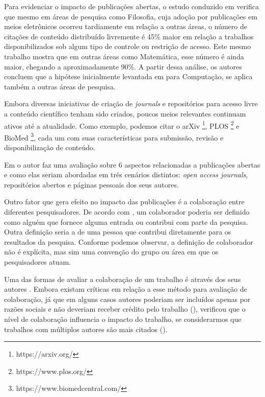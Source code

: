 Para evidenciar o impacto de publicações abertas, o estudo conduzido em \cite{OpenAccess2004} verifica que mesmo em áreas de pesquisa como Filosofia, cuja adoção por publicações em meios eletrônicos ocorreu tardiamente em relação a outras áreas, o número de citações de conteúdo distribuído livremente é 45\% maior em relação a trabalhos disponibilizados sob algum tipo de controle ou restrição de acesso. Este mesmo trabalho mostra que em outras áreas como Matemática, esse número é ainda maior, chegando a aproximadamente 90\%. A partir dessa análise, os autores concluem que a hipótese inicialmente levantada em \cite{Online2001} para Computação, se aplica também a outras áreas de pesquisa.

Embora diversas iniciativas de criação de \textit{journals} e repositórios para acesso livre a conteúdo científico tenham sido criados, poucos meios relevantes continuam ativos até a atualidade. Como exemplo, podemos citar o arXiv \footnote{https://arxiv.org/}, PLOS \footnote{https://www.plos.org/} e BioMed \footnote{https://www.biomedcentral.com/}, cada um com suas características para submissão, revisão e disponibilização de conteúdo.

Em \cite{OpenAccessAnalysis2004} o autor faz uma avaliação sobre 6 aspectos relacionadas a publicações abertas e como elas seriam abordadas em três cenários distintos: \textit{open access journals}, repositórios abertos e páginas pessoais dos seus autores.

Outro fator que gera efeito no impacto das publicações é a colaboração entre diferentes pesquisadores. De acordo com \cite{ResearchCollaboration1997}, um colaborador poderia ser definido como alguém que fornece alguma entrada ou contribui com parte da pesquisa. Outra definição seria a de uma pessoa que contribui diretamente para os resultados da pesquisa. Conforme podemos observar, a definição de colaborador não é explícita, mas sim uma convenção do grupo ou área em que os pesquisadores atuam.

Uma das formas de avaliar a colaboração de um trabalho é através dos seus autores \cite{Bibliographical1971}. Embora existam críticas em relação a esse método para avaliação de colaboração, já que em alguns casos autores poderiam ser incluídos apenas por razões sociais e não deveriam receber crédito pelo trabalho (\cite{Stealing1993}), verificou que o nível de colaboração influencia o impacto do trabalho, se considerarmos que trabalhos com múltiplos autores são mais citados (\cite{Bibliometrics1986}).

